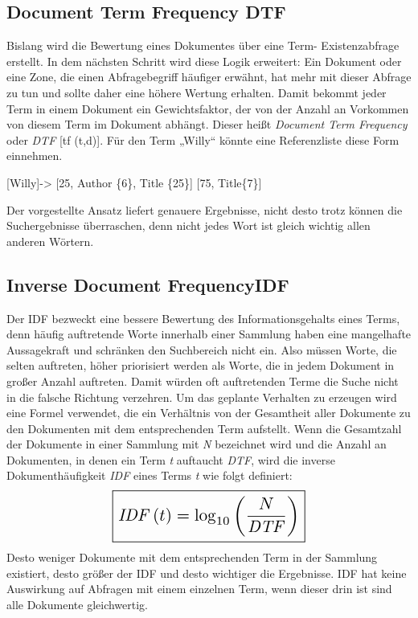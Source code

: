 \subsection[Document Term Frequency DTF]{Document Term Frequency DTF}
Bislang wird die Bewertung eines Dokumentes über eine Term-
Existenzabfrage erstellt. In dem nächsten Schritt wird diese Logik
erweitert: Ein Dokument oder eine Zone, die einen Abfragebegriff
häufiger erwähnt, hat mehr mit dieser Abfrage zu tun und sollte daher
eine höhere Wertung erhalten.
\newline
Damit bekommt jeder Term in einem Dokument ein Gewichtsfaktor, der von
der Anzahl an Vorkommen von diesem Term im Dokument abhängt. Dieser
heißt \textit{Document Term Frequency} oder \textit{DTF} [tf (t,d)]. 
\newline
Für den Term „Willy“ könnte eine Referenzliste diese Form einnehmen.
\begin{center}
 [Willy]-{\textgreater} [25, Author \{6\}, Title \{25\}] [75, Title\{7\}]
\end{center}
Der vorgestellte Ansatz liefert genauere Ergebnisse, nicht desto trotz
können die Suchergebnisse überraschen, denn nicht jedes Wort ist gleich
wichtig allen anderen Wörtern. 

\subsection[Inverse Document Frequency IDF]{Inverse Document FrequencyIDF}
Der IDF bezweckt eine bessere Bewertung des Informationsgehalts eines
Terms, denn häufig auftretende Worte innerhalb einer Sammlung haben
eine mangelhafte Aussagekraft und schränken den Suchbereich nicht ein.
Also müssen Worte, die selten auftreten, höher priorisiert werden als
Worte, die in jedem Dokument in großer Anzahl auftreten. Damit würden
oft auftretenden Terme die Suche nicht in die falsche Richtung
verzehren. 
\bigbreak
Um das geplante Verhalten zu erzeugen wird eine Formel verwendet, die
ein Verhältnis von der Gesamtheit aller Dokumente zu den Dokumenten mit
dem entsprechenden Term aufstellt.
\newline
Wenn die Gesamtzahl der Dokumente in einer Sammlung mit \textit{N} bezeichnet
wird und die Anzahl an Dokumenten, in denen ein Term \textit{t} auftaucht
\textit{DTF}, wird die inverse Dokumenthäufigkeit \textit{IDF} eines Terms \textit{t} wie
folgt definiert: 
\newline
\begin{equation*}
\scalebox{1.5}{\boxed{\mathit{IDF}\left(t\right)={\log}_{10}\left(\frac{N}{\mathit{DTF}}\right)}}
\end{equation*}
\newline
Desto weniger Dokumente mit dem entsprechenden Term in der Sammlung
existiert, desto größer der IDF und desto wichtiger die Ergebnisse.
\newline
IDF hat keine Auswirkung auf Abfragen mit einem einzelnen Term, wenn
dieser drin ist sind alle Dokumente gleichwertig.


